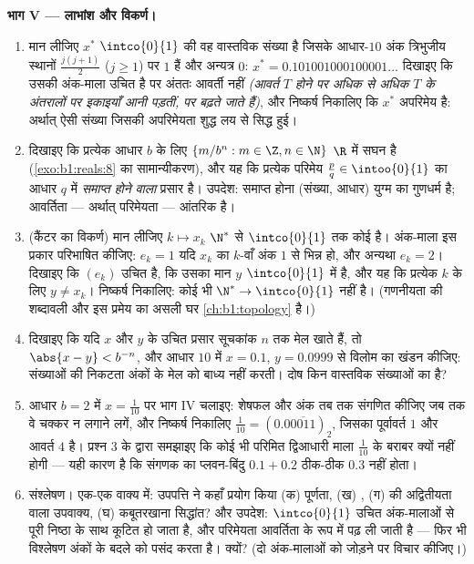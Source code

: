 \begin{problem}
\medskip \noindent\textbf{भाग V --- लाभांश और विकर्ण।}
\begin{enumerate}[resume]
  \item मान लीजिए $x^*$ $\intco{0}{1}$ की वह वास्तविक संख्या है जिसके
  आधार-$10$ अंक त्रिभुजीय स्थानों $\frac{j(j + 1)}{2}$ ($j \geq 1$) पर $1$
  हैं और अन्यत्र $0$: $x^* = 0.101001000100001\dots$ दिखाइए कि उसकी अंक-माला
  उचित है पर अंततः आवर्ती नहीं \emph{(आवर्त $T$ होने पर अधिक से अधिक $T$ के
  अंतरालों पर इकाइयाँ आनी पड़तीं, पर  बढ़ते जाते हैं)}, और निष्कर्ष
  निकालिए कि $x^*$ अपरिमेय है: अर्थात् ऐसी संख्या जिसकी अपरिमेयता शुद्ध लय
  से सिद्ध हुई।
  \item दिखाइए कि प्रत्येक आधार $b$ के लिए  $\{m/b^n : m \in \Z, n
  \in \N\}$ $\R$ में सघन है (\cref{exo:b1:reals:8} का सामान्यीकरण), और यह कि
  प्रत्येक परिमेय $\frac pq \in \intoo{0}{1}$ का आधार $q$ में \emph{समाप्त
  होने वाला} प्रसार है। उपदेश: समाप्त होना (संख्या, आधार) युग्म का गुणधर्म
  है; आवर्तिता --- अर्थात् परिमेयता --- आंतरिक है।
  \item (कैंटर का विकर्ण) मान लीजिए $k \mapsto x_k$ $\N^*$ से $\intco{0}{1}$
  तक कोई  है। अंक-माला इस प्रकार परिभाषित कीजिए: $e_k = 1$ यदि
  $x_k$ का $k$-वाँ अंक $1$ से भिन्न हो, और अन्यथा $e_k = 2$। दिखाइए कि
  $(e_k)$ उचित है, कि उसका मान $y$ $\intco{0}{1}$ में है, और यह कि प्रत्येक
  $k$ के लिए $y \neq x_k$। निष्कर्ष निकालिए: कोई भी  $\N^* \to
  \intco{0}{1}$  नहीं है। (गणनीयता की शब्दावली और इस प्रमेय का असली
  घर \cref{ch:b1:topology} है।)
  \item दिखाइए कि यदि $x$ और $y$ के उचित प्रसार सूचकांक $n$ तक मेल खाते हैं,
  तो $\abs{x - y} < b^{-n}$, और आधार $10$ में $x = 0.1$, $y = 0.0999$ से
  विलोम का खंडन कीजिए: संख्याओं की निकटता अंकों के मेल को बाध्य नहीं करती।
  दोष किन वास्तविक संख्याओं का है?
  \item आधार $b = 2$ में $x = \frac{1}{10}$ पर भाग IV चलाइए: शेषफल और अंक तब
  तक संगणित कीजिए जब तक वे चक्कर न लगाने लगें, और निष्कर्ष निकालिए
  $\frac{1}{10} = (0.0\overline{0011})_2$, जिसका पूर्वावर्त $1$ और आवर्त $4$
  है। प्रश्न 3 के द्वारा समझाइए कि कोई भी परिमित द्विआधारी माला
  $\frac{1}{10}$ के बराबर क्यों नहीं होगी --- यही कारण है कि संगणक का
  प्लवन-बिंदु $0.1 + 0.2$ ठीक-ठीक $0.3$ नहीं होता।
  \item संश्लेषण। एक-एक वाक्य में: उपपत्ति ने कहाँ प्रयोग किया (क) पूर्णता,
  (ख) , (ग)  की अद्वितीयता वाला उपवाक्य, (घ)
  कबूतरखाना सिद्धांत? और उपदेश: $\intco{0}{1}$ उचित अंक-मालाओं से पूरी
  निष्ठा के साथ कूटित हो जाता है, और परिमेयता आवर्तिता के रूप में पढ़ ली
  जाती है --- फिर भी विश्लेषण अंकों के बदले  को पसंद करता है। क्यों?
  (दो अंक-मालाओं को जोड़ने पर विचार कीजिए।)
\end{enumerate}
\end{problem}
